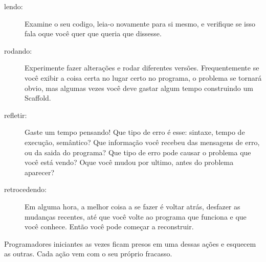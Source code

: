 \begin{description}

\item[lendo:] Examine o seu codigo, leia-o novamente para si mesmo, e 
verifique se isso fala oque você quer que queria que dissesse.

\item[rodando:] Experimente fazer alterações e rodar diferentes 
versões. Frequentemente se você exibir a coisa certa no lugar certo
no programa, o problema se tornará obvio, mas algumas vezes você deve 
gastar algum tempo construindo um Scaffold. 

\item[refletir:] Gaste um tempo pensando! Que tipo de erro é esse:
sintaxe, tempo de execução, semântico? Que informação você recebeu das
mensagens de erro, ou da saida do programa? Que tipo de erro pode causar
o problema que você está vendo? Oque você mudou por ultimo, antes
do problema aparecer?

\item[retrocedendo:] Em alguma hora, a melhor coisa a se fazer é
voltar atrás, desfazer as mudanças recentes, até que você volte ao 
programa que funciona e que você conhece. Então você pode começar a
reconstruir.

\end{description}

Programadores iniciantes as vezes ficam presos em uma dessas ações
e esquecem as outras. Cada ação vem com o seu próprio fracasso. 

